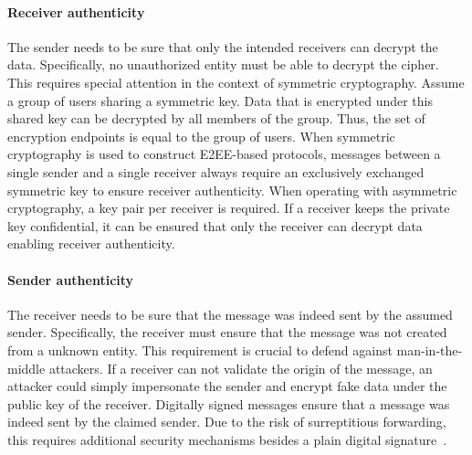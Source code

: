 \documentclass[../main.tex]{subfiles}
\begin{document}
\paragraph{Receiver authenticity}
    The sender needs to be sure that only the intended receivers can decrypt the data.
    Specifically, no unauthorized entity must be able to decrypt the cipher.
    This requires special attention in the context of symmetric cryptography.
    Assume a group of users sharing a symmetric key.
    Data that is encrypted under this shared key can be decrypted by all members of the group.
    Thus, the set of encryption endpoints is equal to the group of users.
    When symmetric cryptography is used to construct E2EE-based protocols, messages between a single sender and a single receiver always require an exclusively exchanged symmetric key to ensure receiver authenticity.
    When operating with asymmetric cryptography, a key pair per receiver is required.
    If a receiver keeps the private key confidential, it can be ensured that only the receiver can decrypt data enabling receiver authenticity.
\paragraph{Sender authenticity} 
    The receiver needs to be sure that the message was indeed sent by the assumed sender.
    Specifically, the receiver must ensure that the message was not created from a unknown entity.
    This requirement is crucial to defend against man-in-the-middle attackers.
    If a receiver can not validate the origin of the message, an attacker could simply impersonate the sender and encrypt fake data under the public key of the receiver.
    Digitally signed messages ensure that a message was indeed sent by the claimed sender.
    Due to the risk of surreptitious forwarding, this requires additional security mechanisms besides a plain digital signature~\cite{Davis2001}.





\end{document}
